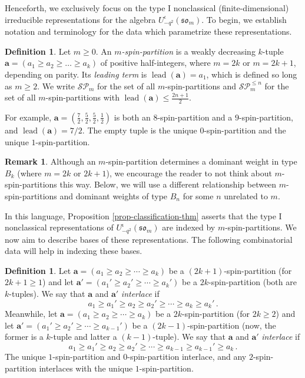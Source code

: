 \documentclass[10pt]{amsart}
\numberwithin{equation}{section}
\theoremstyle{definition}
\newtheorem{rem}[thm]{Remark}
\newtheorem{defn}[thm]{Definition}
\newcommand{\som}[1][m]{\mathfrak{so}_{#1}}
\newcommand{\iqUsom}[1][m]{{U}^{\iota}_{-q^2}(\som[#1])}
\newcommand{\ab}{\mathbf{a}}
\DeclareMathOperator{\lead}{lead}
\newcommand{\SP}{\mathcal{SP}}
\begin{document}
Henceforth, we exclusively focus on the type I nonclassical 
(finite-dimensional) irreducible representations for the algebra $\iqUsom$. 
To begin, we establish notation and terminology for the data which parametrize these representations.

\begin{defn} 
Let $m \ge 0$. 
An \emph{$m$-spin-partition} is a weakly decreasing $k$-tuple $\ab = (a_1 \ge a_2 \ge \ldots \ge a_k)$ of positive half-integers, 
where $m = 2k$ or $m=2k+1$, depending on parity. 
Its \emph{leading term} is $\lead(\ab) = a_1$, which is defined so long as $m \ge 2$. 
We write $\SP_{m}$ for the set of all $m$-spin-partitions and $\SP_m^{\le n}$ for the set of all $m$-spin-partitions 
with $\lead(\ab)\le \frac{2n+1}{2}$.
\end{defn}

For example, $\ab = (\frac{7}{2}, \frac{5}{2}, \frac{5}{2}, \frac{1}{2})$ is both an $8$-spin-partition 
and a $9$-spin-partition, and $\lead(\ab) = 7/2$. 
The empty tuple is the unique $0$-spin-partition and the unique $1$-spin-partition.

\begin{rem} 
Although an $m$-spin-partition determines a dominant weight in type $B_k$ (where $m=2k$ or $2k+1$), 
we encourage the reader to not think about $m$-spin-partitions this way. 
Below, we will use a different relationship between $m$-spin-partitions 
and dominant weights of type $B_n$ for some $n$ unrelated to $m$.
\end{rem} 

In this language, Proposition \ref{prop-classification-thm} asserts that the 
type I nonclassical representations of $\iqUsom$ are indexed by $m$-spin-partitions. 
We now aim to describe bases of these representations. 
The following combinatorial data will help in indexing these bases.

\begin{defn}
Let $\ab = (a_1 \ge a_2 \ge \cdots \ge a_k)$ be a $(2k+1)$-spin-partition (for $2k+1 \ge 1$) 
and let $\ab' = (a_1' \ge a_2' \ge \cdots \ge a_k')$ be a $2k$-spin-partition (both are $k$-tuples). 
We say that $\ab$ and $\ab'$ \emph{interlace} if
\[ 
a_1 \ge a_1' \ge a_2 \ge a_2' \ge \cdots \ge a_k \ge a_k' \, .
\]
Meanwhile, let $\ab = (a_1 \ge a_2 \ge \cdots \ge a_k)$ be a $2k$-spin-partition (for $2k \ge 2$) 
and let $\ab' = (a_1' \ge a_2' \ge \cdots \ge a_{k-1}')$ be a $(2k-1)$-spin-partition 
(now, the former is a $k$-tuple and latter a $(k-1)$-tuple). 
We say that $\ab$ and $\ab'$ \emph{interlace} if
\[
a_1 \ge a_1' \ge a_2 \ge a_2' \ge \cdots \ge a_{k-1} \ge a_{k-1}' \ge a_k \, .
\]
The unique $1$-spin-partition and $0$-spin-partition interlace, 
and any $2$-spin-partition interlaces with the unique $1$-spin-partition.
\end{defn}
\end{document}
